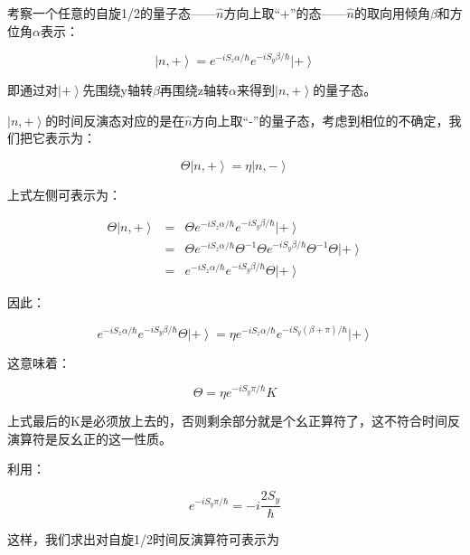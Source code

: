 考察一个任意的自旋1/2的量子态——$\hat n$方向上取“+”的态——$\hat n$的取向用倾角$\beta$和方位角$\alpha$表示：

\begin{equation}
\left| n, + \right\rangle = e^{-i S_z \alpha / \hbar } e^{- i S_y \beta / \hbar} \left| + \right\rangle
\end{equation}

即通过对$\left| + \right\rangle$先围绕y轴转$\beta$再围绕z轴转$\alpha$来得到$\left| n, + \right\rangle$的量子态。

$\left| n, + \right\rangle$的时间反演态对应的是在$\hat n$方向上取“-”的量子态，考虑到相位的不确定，我们把它表示为：

\begin{equation}
\Theta \left| n, + \right\rangle = \eta  \left| n, - \right\rangle
\end{equation}

上式左侧可表示为：

\begin{eqnarray*}
\Theta \left| n, + \right\rangle  & = & \Theta e^{-i S_z \alpha / \hbar } e^{- i S_y \beta / \hbar} \left| + \right\rangle \\
{} & = & \Theta e^{-i S_z \alpha / \hbar } \Theta^{-1} \Theta e^{- i S_y \beta / \hbar} \Theta^{-1} \Theta \left| + \right\rangle \\
{} & = & e^{-i S_z \alpha / \hbar } e^{- i S_y \beta / \hbar}  \Theta \left| + \right\rangle
\end{eqnarray*}

因此：

\begin{equation}
e^{-i S_z \alpha / \hbar } e^{- i S_y \beta / \hbar}  \Theta \left| + \right\rangle = \eta e^{-i S_z \alpha / \hbar } e^{- i S_y (\beta + \pi) / \hbar} \left| + \right\rangle
\end{equation}

这意味着：

\begin{equation}
\Theta = \eta e^{- i S_y \pi / \hbar} K
\end{equation}

上式最后的K是必须放上去的，否则剩余部分就是个幺正算符了，这不符合时间反演算符是反幺正的这一性质。

利用：

\begin{equation}
e^{-i S_y \pi / \hbar } = - i \frac{2S_y}{\hbar}
\end{equation}

这样，我们求出对自旋1/2时间反演算符可表示为

